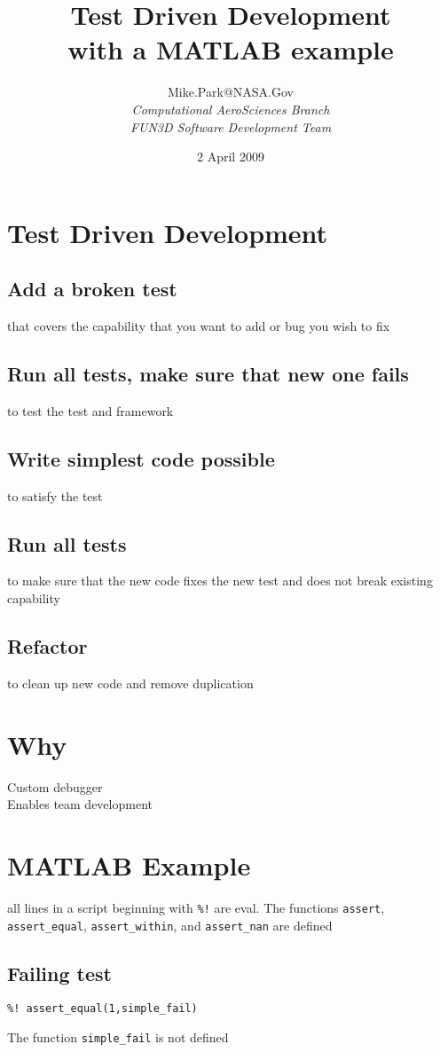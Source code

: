\documentclass[twocolumn]{article}
\title{{\bfseries\Large Test Driven Development}\\ with a MATLAB example}
\author{
Mike.Park@NASA.Gov\\
	 {\itshape Computational AeroSciences Branch} \\
	 {\itshape FUN3D Software Development Team}
}
\date{2 April 2009}
\begin{document}
  
  \maketitle

  \section{Test Driven Development}
  \subsection{Add a broken test}
  that covers the capability that you want to add or bug you wish to fix
  \subsection{Run all tests, make sure that new one fails}
  to test the test and framework
  \subsection{Write simplest code possible}
  to satisfy the test
  \subsection{Run all tests}
  to make sure that the new code fixes the new test and does not break
  existing capability
  \subsection{Refactor}
  to clean up new code and remove duplication

  \section{Why}

  Custom debugger\\
  Enables team development

  \section{MATLAB Example}
  all lines in a script beginning with \texttt{\%!} are eval. 
  The functions \texttt{assert}, \texttt{assert\_equal}, 
  \texttt{assert\_within}, and \texttt{assert\_nan} are defined
  \subsection{Failing test}
  \begin{verbatim}
%! assert_equal(1,simple_fail)
  \end{verbatim}
  The function \texttt{simple\_fail} is not defined 
\end{document}
